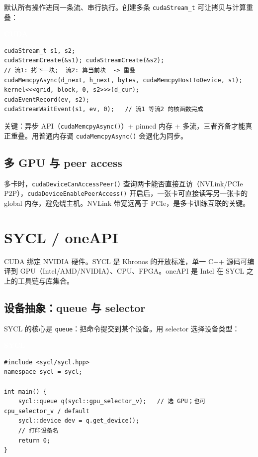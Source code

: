 \documentclass[12pt,a4paper,fontset=fandol]{ctexbook}
\newcommand{\cudalabel}{%
  \begin{tcolorbox}[enhanced,colback=cudaheadbg,colframe=cudaheadbg,
    arc=1mm,boxrule=0mm,left=6pt,right=6pt,top=2pt,bottom=2pt,
    halign=left,oversize]
    \textcolor{white}{\small\bfseries CUDA}
  \end{tcolorbox}\vspace{-4pt}}
\newcommand{\sycllabel}{%
  \begin{tcolorbox}[enhanced,colback=syclheadbg,colframe=syclheadbg,
    arc=1mm,boxrule=0mm,left=6pt,right=6pt,top=2pt,bottom=2pt,
    halign=left,oversize]
    \textcolor{white}{\small\bfseries SYCL}
  \end{tcolorbox}\vspace{-4pt}}
\newcommand{\Fn}[1]{\texttt{#1()}}
\begin{document}
默认所有操作进同一条流、串行执行。创建多条 \texttt{cudaStream\_t} 可让拷贝与计算重叠：

\cudalabel
\begin{lstlisting}[style=cudastyle]
cudaStream_t s1, s2;
cudaStreamCreate(&s1); cudaStreamCreate(&s2);
// 流1: 拷下一块;  流2: 算当前块  -> 重叠
cudaMemcpyAsync(d_next, h_next, bytes, cudaMemcpyHostToDevice, s1);
kernel<<<grid, block, 0, s2>>>(d_cur);
cudaEventRecord(ev, s2);
cudaStreamWaitEvent(s1, ev, 0);   // 流1 等流2 的核函数完成
\end{lstlisting}

关键：异步 API（\Fn{cudaMemcpyAsync}）+ pinned 内存 + 多流，三者齐备才能真正重叠。用普通内存调 \Fn{cudaMemcpyAsync} 会退化为同步。

\section{多 GPU 与 peer access}\label{sec:cuda-peer}

多卡时，\Fn{cudaDeviceCanAccessPeer} 查询两卡能否直接互访（NVLink/PCIe P2P），\Fn{cudaDeviceEnablePeerAccess} 开启后，一张卡可直接读写另一张卡的 global 内存，避免绕主机。NVLink 带宽远高于 PCIe，是多卡训练互联的关键。

\chapter{SYCL / oneAPI}\label{ch:sycl}

CUDA 绑定 NVIDIA 硬件。SYCL 是 Khronos 的开放标准，单一 C++ 源码可编译到 GPU（Intel/AMD/NVIDIA）、CPU、FPGA。oneAPI 是 Intel 在 SYCL 之上的工具链与库集合。

\section{设备抽象：queue 与 selector}\label{sec:sycl-queue}

SYCL 的核心是 \texttt{queue}：把命令提交到某个设备。用 selector 选择设备类型：

\sycllabel
\begin{lstlisting}[style=syclstyle]
#include <sycl/sycl.hpp>
namespace sycl = sycl;

int main() {
    sycl::queue q(sycl::gpu_selector_v);   // 选 GPU；也可 cpu_selector_v / default
    sycl::device dev = q.get_device();
    // 打印设备名
    return 0;
}
\end{lstlisting}
\end{document}
